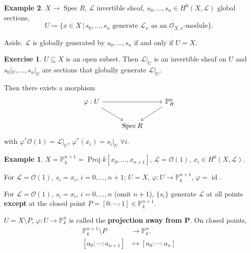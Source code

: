 \documentclass[12pt]{article}
\DeclareMathOperator{\id}{id}
\DeclareMathOperator{\Spec}{Spec}
\DeclareMathOperator{\Proj}{Proj}
\theoremstyle{definition}
\newtheorem*{exercise}{Exercise}
\newtheorem*{example}{Example}
\begin{document}
\begin{example}
$X\rightarrow\Spec R$, $\mathcal{L}$ invertible sheaf, $s_0,\ldots,s_n\in H^0(X,\mathcal{L})$ global sections,
\[U\coloneqq\{x\in X\,|\,s_0,\ldots,s_n\text{ generate }\mathcal{L}_x\text{ as an }\mathcal{O}_{X,x}\text{-module}\}.\]

Aside. $\mathcal{L}$ is globally generated by $s_0,\ldots,s_n$ if and only if $U=X$.

\begin{exercise}
$U\subseteq X$ is an open subset. Then $\mathcal{L}|_U$ is an invertible sheaf on $U$ and $s_0|_U,\ldots,s_n|_U$ are sections that globally generate $\mathcal{L}|_U$.

Then there exists a morphism
\[
\begin{tikzcd}
\varphi:U\arrow[rr]\arrow[rd]&&\mathbb{P}_R^n\arrow[ld]\\
&\Spec R
\end{tikzcd}
\]
with $\varphi^*\mathcal{O}(1)=\mathcal{L}|_U$, $\varphi^*(x_i)=s_i|_U$ $\forall i$.
\end{exercise}

\begin{example}
$X=\mathbb{P}_k^{n+1}=\Proj k[x_0,\ldots,x_{n+1}]$, $\mathcal{L}=\mathcal{O}(1)$, $x_i\in H^0(X,\mathcal{L})$.

For $\mathcal{L}=\mathcal{O}(1)$, $s_i=x_i$, $i=0,\ldots,n+1$; $U=X$, $\varphi:U\rightarrow\mathbb{P}_k^{n+1}$, $\varphi=\id$.
\end{example}

For $\mathcal{L}=\mathcal{O}(1)$, $s_i=x_i$, $i=0,\ldots,n$ (omit $n+1$), $\{s_i\}$ generate $\mathcal{L}$ at all points \textbf{except} at the closed point $P=[0:\cdots:1]\in\mathbb{P}_k^{n+1}$.

$U=X\setminus P$, $\varphi:U\rightarrow\mathbb{P}_k^n$ is called the \textbf{projection away from $\boldsymbol{P}$}. On closed points,
\begin{align*}
\mathbb{P}_k^{n+1}\setminus P&\longrightarrow\mathbb{P}_k^n.\\
[a_0:\cdots:a_{n+1}]&\longmapsto[a_0:\cdots:a_n]
\end{align*}
\end{example}
\end{document}
